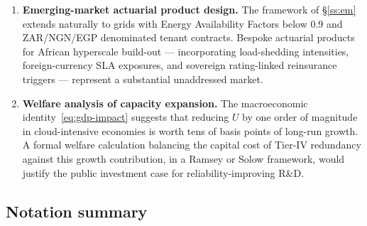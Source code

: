 \documentclass[11pt,a4paper]{article}
\theoremstyle{ia}
\newcommand{\1}{\mathbf{1}}
\begin{document}
\begin{enumerate}[leftmargin=*,nosep]
        $P^{\mathrm{soc}}$ of~\eqref{eq:pigou} requires empirical
        estimation of the external cost rate $\mathcal{E}$. Industry
        consortia, regulators, and academia must jointly assemble the
        evidence base for this number; its current absence is the
        single largest source of underpricing in the asset class.
  \item \textbf{Emerging-market actuarial product design.} The
        framework of \S\ref{ss:em} extends naturally to grids with
        Energy Availability Factors below 0.9 and ZAR/NGN/EGP
        denominated tenant contracts. Bespoke actuarial products for
        African hyperscale build-out — incorporating load-shedding
        intensities, foreign-currency SLA exposures, and sovereign
        rating-linked reinsurance triggers — represent a substantial
        unaddressed market.
  \item \textbf{Welfare analysis of capacity expansion.} The
        macroeconomic identity~\eqref{eq:gdp-impact} suggests that
        reducing $U$ by one order of magnitude in cloud-intensive
        economies is worth tens of basis points of long-run growth.
        A formal welfare calculation balancing the capital cost of
        Tier-IV redundancy against this growth contribution, in a
        Ramsey or Solow framework, would justify the public
        investment case for reliability-improving R\&D.
\end{enumerate}

\subsection*{Notation summary}
\end{document}
